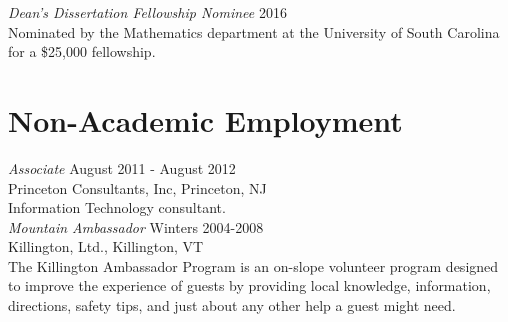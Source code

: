 \documentclass{article}
\begin{document}
\noindent\textsl{Dean's Dissertation Fellowship Nominee} \hfill 2016\\
Nominated by the Mathematics department at the University of South Carolina for a \$25,000 fellowship.

\section*{Non-Academic Employment}             
\textsl{Associate} \hfill August 2011 - August 2012\\
Princeton Consultants, Inc, Princeton, NJ\\
Information Technology consultant.\\

\noindent\textsl{Mountain Ambassador} \hfill Winters 2004-2008\\
Killington, Ltd., Killington, VT \\
The Killington Ambassador Program is an on-slope volunteer program
designed to improve the experience of guests by providing local knowledge, 
information, directions, safety tips, and just about any other help a guest might need.

\end{document}
